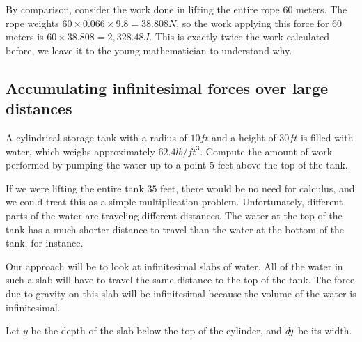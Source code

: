 \documentclass{ximera}
\begin{document}
\begin{example}
\begin{explanation}
    By comparison, consider the work done in lifting the entire rope
    $60$ meters. The rope weights $60\times 0.066 \times 9.8 =
    38.808\unit{N}$, so the work applying this force for 60 meters is
    $60\times 38.808 = 2,328.48 \unit{J}$. This is exactly twice the
    work calculated before, we leave it to the young mathematician to
    understand why.
  \end{explanation}
\end{example}

\subsection{Accumulating infinitesimal forces over large distances}


\begin{example}
  A cylindrical storage tank with a radius of $10 \unit{ft}$ and a
  height of $30\unit{ft}$ is filled with water, which weighs
  approximately $62.4 \unit{lb}/\unit{ft}^3$. Compute the amount of
  work performed by pumping the water up to a point $5$ feet above the
  top of the tank.
  \begin{explanation}
    If we were lifting the entire tank $35$ feet, there would be no
    need for calculus, and we could treat this as a simple
    multiplication problem.  Unfortunately, different parts of the
    water are traveling different distances.  The water at the top of
    the tank has a much shorter distance to travel than the water at
    the bottom of the tank, for instance.
	
    Our approach will be to look at infinitesimal slabs of water.  All
    of the water in such a slab will have to travel the same distance
    to the top of the tank.  The force due to gravity on this slab
    will be infinitesimal because the volume of the water is
    infinitesimal.
    
    Let $y$ be the depth of the slab below the top of the cylinder,
    and $\mathop{}\!d\! y$ be its width.

    \begin{image}
\end{image}
\end{explanation}
\end{example}
\end{document}
